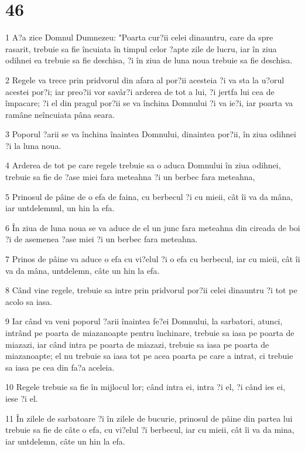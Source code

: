 \chapter{46}

\par 1 A?a zice Domnul Dumnezeu: "Poarta cur?ii celei dinauntru, care da spre rasarit, trebuie sa fie încuiata în timpul celor ?apte zile de lucru, iar în ziua odihnei ea trebuie sa fie deschisa, ?i în ziua de luna noua trebuie sa fie deschisa.
\par 2 Regele va trece prin pridvorul din afara al por?ii acesteia ?i va sta la u?orul acestei por?i; iar preo?ii vor savâr?i arderea de tot a lui, ?i jertfa lui cea de împacare; ?i el din pragul por?ii se va închina Domnului ?i va ie?i, iar poarta va ramâne neîncuiata pâna seara.
\par 3 Poporul ?arii se va închina înaintea Domnului, dinaintea por?ii, în ziua odihnei ?i la luna noua.
\par 4 Arderea de tot pe care regele trebuie sa o aduca Domnului în ziua odihnei, trebuie sa fie de ?ase miei fara meteahna ?i un berbec fara meteahna,
\par 5 Prinosul de pâine de o efa de faina, cu berbecul ?i cu mieii, cât îi va da mâna, iar untdelemnul, un hin la efa.
\par 6 În ziua de luna noua se va aduce de el un junc fara meteahna din cireada de boi ?i de asemenea ?ase miei ?i un berbec fara meteahna.
\par 7 Prinos de pâine va aduce o efa cu vi?elul ?i o efa cu berbecul, iar cu mieii, cât îi va da mâna, untdelemn, câte un hin la efa.
\par 8 Când vine regele, trebuie sa intre prin pridvorul por?ii celei dinauntru ?i tot pe acolo sa iasa.
\par 9 Iar când va veni poporul ?arii înaintea fe?ei Domnului, la sarbatori, atunci, intrând pe poarta de miazanoapte pentru închinare, trebuie sa iasa pe poarta de miazazi, iar când intra pe poarta de miazazi, trebuie sa iasa pe poarta de miazanoapte; el nu trebuie sa iasa tot pe acea poarta pe care a intrat, ci trebuie sa iasa pe cea din fa?a aceleia.
\par 10 Regele trebuie sa fie în mijlocul lor; când intra ei, intra ?i el, ?i când ies ei, iese ?i el.
\par 11 În zilele de sarbatoare ?i în zilele de bucurie, prinosul de pâine din partea lui trebuie sa fie de câte o efa, cu vi?elul ?i berbecul, iar cu mieii, cât îi va da mina, iar untdelemn, câte un hin la efa.
